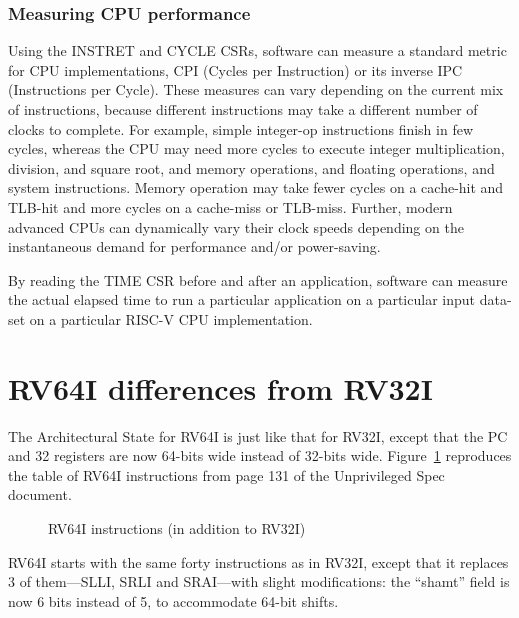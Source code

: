 
\subsubsection{Measuring CPU performance}

\label{Sec_CPU_Performance}


Using the INSTRET and CYCLE CSRs, software can measure a standard
metric for CPU implementations, CPI (Cycles per Instruction) or its
inverse IPC (Instructions per Cycle).  These measures can vary
depending on the current mix of instructions, because different
instructions may take a different number of clocks to complete.  For
example, simple integer-op instructions finish in few cycles, whereas
the CPU may need more cycles to execute integer multiplication,
division, and square root, and memory operations, and floating
operations, and system instructions.  Memory operation may take fewer
cycles on a cache-hit and TLB-hit and more cycles on a cache-miss or
TLB-miss.  Further, modern advanced CPUs can dynamically vary their
clock speeds depending on the instantaneous demand for performance
and/or power-saving.

By reading the TIME CSR before and after an application, software can
measure the actual elapsed time to run a particular application on a
particular input data-set on a particular RISC-V CPU implementation.


\section{RV64I differences from RV32I}

\label{Sec_RV64I}

The Architectural State for RV64I is just like that for RV32I, except
that the PC and 32 registers are now 64-bits wide instead of 32-bits
wide.  Figure~\ref{Fig_RV64I} reproduces the table of RV64I
instructions from page 131 of the Unprivileged Spec document.
\begin{figure}[htbp]
  \centerline{}
  \caption{\label{Fig_RV64I} RV64I instructions (in addition to RV32I)}
\end{figure}
RV64I starts with the same forty instructions as in RV32I, except that
it replaces 3 of them---SLLI, SRLI and SRAI---with slight
modifications: the ``shamt'' field is now 6 bits instead of 5, to
accommodate 64-bit shifts.

